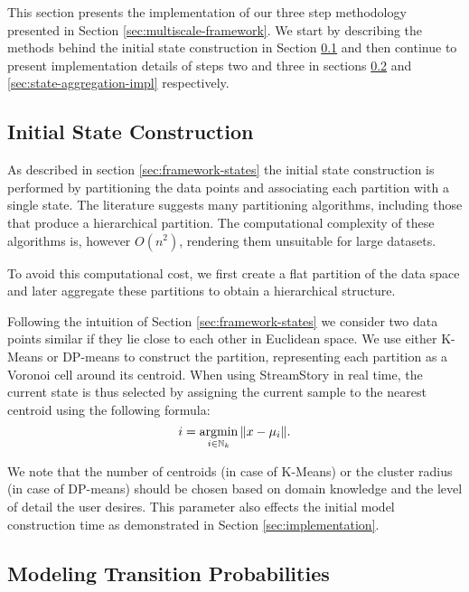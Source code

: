 This section presents the implementation of our three step methodology presented in Section \ref{sec:multiscale-framework}.
We start by describing the methods behind the initial state construction in Section \ref{sec:state-construction-impl}
and then continue to present implementation details of steps two and three in sections \ref{sec:transition-probs-impl}
and \ref{sec:state-aggregation-impl} respectively.

\subsection{Initial State Construction}
\label{sec:state-construction-impl}

As described in section \ref{sec:framework-states} the initial state construction is performed by partitioning
the data points and associating each partition with a single state. The literature suggests many partitioning
algorithms, including those that produce a hierarchical partition. The computational complexity of these algorithms
is, however $O(n^2)$, rendering them unsuitable for large datasets.

To avoid this computational cost, we first create a flat partition of the data space and later aggregate these
partitions to obtain a hierarchical structure.

Following the intuition of Section \ref{sec:framework-states} we consider two data points similar if they lie close
to each other in Euclidean space. 
We use either K-Means or DP-means \cite{DBLP:journals/corr/abs-1111-0352} to construct the partition, representing each 
partition as a Voronoi cell around its centroid. When using StreamStory in real time, the current state is thus
selected by assigning the current sample to the nearest centroid using the following formula:
\begin{equation}
	\nonumber
	i = \argmin_{i \in \mathbb{N}_k} \|x - \mu_i\|.
\end{equation}

We note that the number of centroids (in case of K-Means) or the cluster radius (in case of DP-means) should
be chosen based on domain knowledge and the level of detail the user desires. This parameter also effects the 
initial model construction time as demonstrated in Section \ref{sec:implementation}.

\subsection{Modeling Transition Probabilities}
\label{sec:transition-probs-impl}


